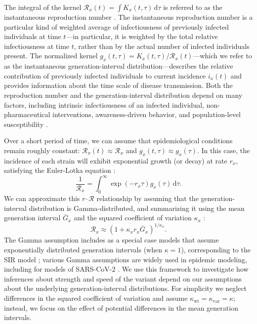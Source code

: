 \documentclass[12pt]{article}
\newcommand{\RR}{\ensuremath{{\mathcal R}}\xspace}
\newcommand{\dd}[1]{\ensuremath{\, \mathrm{d}#1}}
\newcommand{\dtau}{\dd{\tau}}
\begin{document}
The integral of the kernel $\RR_x(t) = \int K_x(t, \tau) \dtau$ is referred to as the instantaneous reproduction number \citep{fraser2007estimating}.
The instantaneous reproduction number is a particular kind of weighted average of infectiousness of previously infected individuals at time $t$---in particular, it is weighted by the total relative infectiousness at time $t$, rather than by the actual number of infected individuals present.
The normalized kernel $g_x(t, \tau) = K_x(t, \tau)/\RR_x(t)$---which we refer to as the instantaneous generation-interval distribution---describes the relative contribution of previously infected individuals to current incidence $i_x(t)$ and provides information about the time scale of disease transmission.
Both the reproduction number and the generation-interval distribution depend on many factors, including intrinsic infectiousness of an infected individual, non-pharmaceutical interventions, awareness-driven behavior, and population-level susceptibility \citep{fraser2007estimating}.

Over a short period of time, we can assume that epidemiological conditions remain roughly constant: $\RR_x(t) \approx \RR_x$ and $g_x(t, \tau) \approx g_x(\tau)$.
In this case, the incidence of each strain will exhibit exponential growth (or decay) at rate $r_x$, satisfying the Euler-Lotka equation \citep{wallinga2007generation}:
\begin{equation}
\frac{1}{\RR_x} = \int_0^\infty \exp(- r_x \tau) g_x(\tau) \dtau.
\end{equation}
We can approximate this $r$--$\RR$ relationship by assuming that the generation-interval distribution is Gamma-distributed, and summarizing it using the mean generation interval $\bar{G}_x$ and the squared coefficient of variation $\kappa_x$ \citep{park2019practical}:
\begin{equation}
\RR_x \approx (1 + \kappa_x r_x \bar{G}_x)^{1/\kappa_x}.
\end{equation}
The Gamma assumption includes as a special case models that assume exponentially distributed generation intervals (when $\kappa=1$), corresponding to the SIR model \citep{anderson1991infectious}; various Gamma assumptions are widely used in epidemic modeling, including for models of SARS-CoV-2 \citep{doi:10.1098/rsif.2020.0144}.
We use this framework to investigate how inferences about strength and speed of the variant depend on our assumptions about the underlying generation-interval distributions.
For simplicity we neglect differences in the squared coefficient of variation and assume $\kappa_{\mathrm{wt}} = \kappa_{\mathrm{var}} = \kappa$; instead, we focus on the effect of potential differences in the mean generation intervals.
\end{document}
